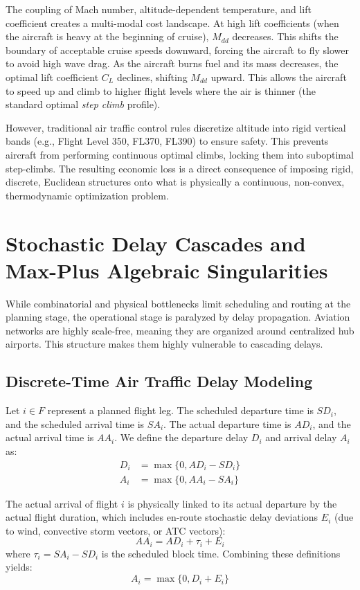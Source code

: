 \documentclass[11pt,a4paper]{book}
\begin{document}
The coupling of Mach number, altitude-dependent temperature, and lift coefficient creates a multi-modal cost landscape. At high lift coefficients (when the aircraft is heavy at the beginning of cruise), $M_{dd}$ decreases. This shifts the boundary of acceptable cruise speeds downward, forcing the aircraft to fly slower to avoid high wave drag. As the aircraft burns fuel and its mass decreases, the optimal lift coefficient $C_L$ declines, shifting $M_{dd}$ upward. This allows the aircraft to speed up and climb to higher flight levels where the air is thinner (the standard optimal \textit{step climb} profile).

However, traditional air traffic control rules discretize altitude into rigid vertical bands (e.g., Flight Level 350, FL370, FL390) to ensure safety. This prevents aircraft from performing continuous optimal climbs, locking them into suboptimal step-climbs. The resulting economic loss is a direct consequence of imposing rigid, discrete, Euclidean structures onto what is physically a continuous, non-convex, thermodynamic optimization problem.

\section{Stochastic Delay Cascades and Max-Plus Algebraic Singularities}

While combinatorial and physical bottlenecks limit scheduling and routing at the planning stage, the operational stage is paralyzed by delay propagation. Aviation networks are highly scale-free, meaning they are organized around centralized hub airports. This structure makes them highly vulnerable to cascading delays.

\subsection{Discrete-Time Air Traffic Delay Modeling}

Let $i \in F$ represent a planned flight leg. The scheduled departure time is $SD_i$, and the scheduled arrival time is $SA_i$. The actual departure time is $AD_i$, and the actual arrival time is $AA_i$. We define the departure delay $D_i$ and arrival delay $A_i$ as:
\begin{align}
D_i &= \max\{0, AD_i - SD_i\} \\
A_i &= \max\{0, AA_i - SA_i\}
\end{align}

The actual arrival of flight $i$ is physically linked to its actual departure by the actual flight duration, which includes en-route stochastic delay deviations $E_i$ (due to wind, convective storm vectors, or ATC vectors):
\begin{equation}
AA_i = AD_i + \tau_i + E_i
\end{equation}
where $\tau_i = SA_i - SD_i$ is the scheduled block time. Combining these definitions yields:
\begin{equation}
A_i = \max\{0, D_i + E_i\}
\end{equation}
\end{document}
